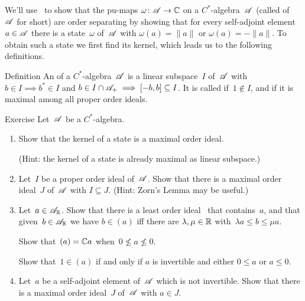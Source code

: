 \documentclass[a]{subfiles}
\begin{document}
\begin{parsec}%
\begin{point}%
We'll use~
to show 
that the pu-maps $\omega\colon \mathscr{A}\to\mathbb{C}$
on a $C^*$-algebra~$\mathscr{A}$
(called %
of~$\mathscr{A}$ for short)
are order separating
by showing that
for every self-adjoint element~$a\in \mathscr{A}$
there is a state~$\omega$ of~$\mathscr{A}$ with $\omega(a)=\|a\|$ or 
$\omega(a)=-\|a\|$.
To obtain such a state
we first find its kernel,
which leads us to the following definitions.
\end{point}
\begin{point}{Definition}%
An %
of a $C^*$-algebra~$\mathscr{A}$
is a linear subspace~$I$ of~$\mathscr{A}$
with $b\in I\implies b^*\in I$
and $b\in I\cap\mathscr{A}_{+}\implies [-b,b]\subseteq I$.
It is called %
if~$1\notin I$,
and  
if it is maximal among all proper order ideals.
\end{point}
\begin{point}{Exercise}%
Let~$\mathscr{A}$ be a $C^*$-algebra.
\begin{enumerate}
\item
Show that the kernel of a state is a maximal order ideal.

(Hint: the kernel of a state is already maximal as linear subspace.)
\item
Let~$I$ be a proper order ideal of~$\mathscr{A}$.
Show that there is a maximal 
order ideal~$J$ of~$\mathscr{A}$ with $I\subseteq J$.
(Hint: Zorn's Lemma may be useful.)
\item
Let~$a\in \mathscr{A}_{\mathbb{R}}$.
Show that there is a least order ideal~%
that contains~$a$,
and that given~$b\in\mathscr{A}_{\mathbb{R}}$
we have $b\in (a)$
iff there are $\lambda,\mu\in \mathbb{R}$
with~$\lambda a\leq b\leq \mu a$.

Show that~$(a)=\mathbb{C} a$
when~$0\nleq a\nleq 0$.

Show that~$1\in (a)$ if and only if $a$ is invertible
and either $0\leq a$ or $a\leq 0$.

\item
Let~$a$ be a self-adjoint element of~$\mathscr{A}$ which
is not invertible.
Show that there is a maximal order ideal~$J$
of~$\mathscr{A}$
with $a\in J$.


\end{enumerate}
\end{point}
\end{parsec}
\end{document}
